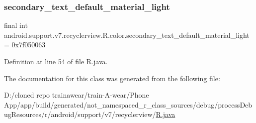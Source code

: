\subsubsection{\texorpdfstring{secondary\_text\_default\_material\_light}{secondary\_text\_default\_material\_light}}
{\footnotesize\ttfamily final int android.\+support.\+v7.\+recyclerview.\+R.\+color.\+secondary\+\_\+text\+\_\+default\+\_\+material\+\_\+light = 0x7f050063\hspace{0.3cm}{\ttfamily [static]}}



Definition at line 54 of file R.\+java.



The documentation for this class was generated from the following file\+:\begin{DoxyCompactItemize}
\item 
D\+:/cloned repo trainawear/train-\/\+A-\/wear/\+Phone App/app/build/generated/not\+\_\+namespaced\+\_\+r\+\_\+class\+\_\+sources/debug/process\+Debug\+Resources/r/android/support/v7/recyclerview/\mbox{\hyperlink{process_debug_resources_2r_2android_2support_2v7_2recyclerview_2_r_8java}{R.\+java}}\end{DoxyCompactItemize}
